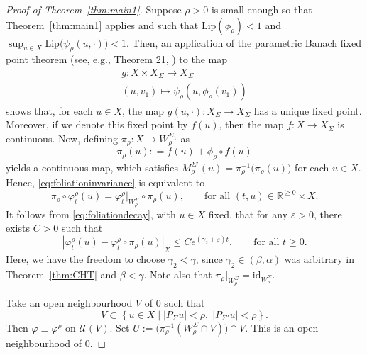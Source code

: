 \documentclass[a4paper, 12pt, oneside, reqno, notitlepage]{amsart}
\theoremstyle{plain}
\theoremstyle{definition}
\theoremstyle{remark}
\newcommand{\lip}{\mathrm{Lip}}
\begin{document}
\begin{proof}[Proof of Theorem~\ref{thm:main1}]
Suppose $\rho >0$ is small enough so that Theorem~\ref{thm:main1} applies and such that $\lip(\phi_\rho) < 1$ and $\sup_{u \in X} \lip \big(\psi_\rho(u,\cdot) \big) < 1$.
Then, an application of the parametric Banach fixed point theorem (see, e.g., Theorem 21, \cite{Irwin72}) to the map
\begin{gather*}
     g: X \times X_\Sigma \to  X_\Sigma \\ 
    (u,v_1) \mapsto \psi_\rho(u,\phi_\rho(v_1))
\end{gather*}
shows that, for each $u \in X$, the map $g(u,\cdot) :X_\Sigma \to  X_\Sigma$ has a unique fixed point.
Moreover, if we denote this fixed point by $f (u)$, then the map $ f: X \to X_\Sigma$ is continuous.
Now, defining $\pi_\rho: X \to  W^{\Sigma_1}_\rho$ as
\begin{displaymath}
   \pi_\rho(u): = f(u)+\phi_\rho \circ f (u)
\end{displaymath}
yields a continuous map, which satisfies   $M^{\Sigma'}_\rho(u) = \pi_\rho^{-1} \big( \pi_\rho(u) \big)$ for each $u \in X$.
Hence, \eqref{eq:foliationinvariance} is equivalent to
\begin{equation}
    \pi_\rho \circ \varphi_t^{\rho}(u) = \varphi_t^\rho \vert_{W^{\Sigma}_\rho} \circ \pi_\rho(u), \qquad \text{for all } (t,u) \in \mathbb{R}^{\geq 0 } \times X.
    \label{eq:pirho}
\end{equation}
It follows from \eqref{eq:foliationdecay}, with $u \in X$ fixed, that for any $\varepsilon > 0$, there exists $C > 0$ such that 
\begin{equation}
    | \varphi_t^\rho(u) - \varphi_t^\rho \circ \pi_\rho (u)|_X \leq C e^{(\gamma_2 + \varepsilon) t} , \qquad \text{for all } t \geq 0. 
    \label{eq:decayrho}
\end{equation}
Here, we have the freedom to choose $\gamma_2 < \gamma$, since $\gamma_2 \in (\beta,\alpha)$ was arbitrary in Theorem~\ref{thm:CHT} and $\beta < \gamma$.
Note also that $\pi_\rho |_{W^\Sigma_\rho} = \mathrm{id}_{W^{\Sigma}_\rho}$.

Take an open neighbourhood $V$ of $0$ such that 
\begin{displaymath}
    V \subset \left\{ u \in X \; \big| \; |P_\Sigma u | < \rho, \;  |P_{\Sigma'} u | < \rho \right\}.
\end{displaymath}
Then $\varphi \equiv \varphi^\rho$ on $\mathcal{U}(V)$.
Set $U := \big( \pi_\rho^{-1} (W^\Sigma_\rho \cap V) \big) \cap V$.
This is an open neighbourhood of $0$.


\end{proof}
\end{document}
